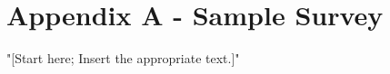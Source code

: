\newpage
\section{\protect\centering Appendix A - Sample Survey}
"[Start here; Insert the appropriate text.]"
